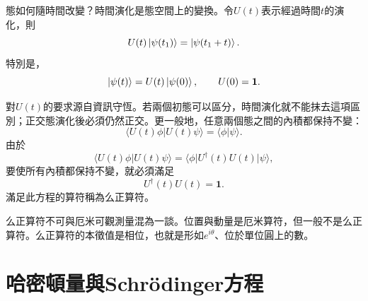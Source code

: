 態如何隨時間改變？時間演化是態空間上的變換。令\(U(t)\)表示經過時間\(t\)的演化，則
\begin{equation}
U(t)\left\lvert\psi(t_1)\right\rangle=\left\lvert\psi(t_1+t)\right\rangle.
\end{equation}
特別是，
\begin{equation}
\left\lvert\psi(t)\right\rangle=U(t)\left\lvert\psi(0)\right\rangle,
\qquad
U(0)=\mathbf 1.
\end{equation}

對\(U(t)\)的要求源自資訊守恆。若兩個初態可以區分，時間演化就不能抹去這項區別；正交態演化後必須仍然正交。更一般地，任意兩個態之間的內積都保持不變：
\begin{equation}
\langle U(t)\phi|U(t)\psi\rangle
=\langle\phi|\psi\rangle.
\end{equation}
由於
\begin{equation}
\langle U(t)\phi|U(t)\psi\rangle
=\langle\phi|U^\dagger(t)U(t)|\psi\rangle,
\end{equation}
要使所有內積都保持不變，就必須滿足
\begin{equation}
U^\dagger(t)U(t)=\mathbf 1.
\end{equation}
滿足此方程的算符稱為么正算符。

\begin{classroomqa}
\end{classroomqa}


么正算符不可與厄米可觀測量混為一談。位置與動量是厄米算符，但一般不是么正算符。么正算符的本徵值是相位，也就是形如\(e^{i\theta}\)、位於單位圓上的數。

\begin{classroomqa}
\end{classroomqa}

\section{哈密頓量與Schr\"odinger方程}

